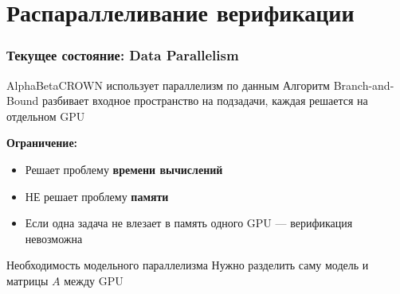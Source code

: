 
\section{Распараллеливание верификации}

\begin{frame}
\frametitle{Текущее состояние: Data Parallelism}

\begin{block}{AlphaBetaCROWN использует параллелизм по данным}
Алгоритм Branch-and-Bound разбивает входное пространство на подзадачи, каждая решается на отдельном GPU
\end{block}

\vspace{0.5cm}

\textbf{Ограничение:}
\begin{itemize}
    \item Решает проблему \textbf{времени вычислений}
    \item НЕ решает проблему \textbf{памяти}
    \item Если одна задача не влезает в память одного GPU --- верификация невозможна
\end{itemize}

\vspace{0.3cm}

\begin{alertblock}{Необходимость модельного параллелизма}
Нужно разделить саму модель и матрицы $A$ между GPU
\end{alertblock}

\end{frame}

